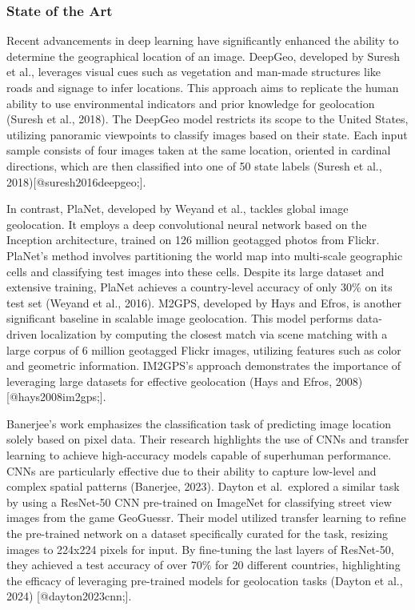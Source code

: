 \documentclass{article}
\begin{document}
\subsubsection{State of the Art}\label{state-of-the-art}

Recent advancements in deep learning have significantly enhanced the
ability to determine the geographical location of an image. DeepGeo,
developed by Suresh et al., leverages visual cues such as vegetation and
man-made structures like roads and signage to infer locations. This
approach aims to replicate the human ability to use environmental
indicators and prior knowledge for geolocation (Suresh et al., 2018).
The DeepGeo model restricts its scope to the United States, utilizing
panoramic viewpoints to classify images based on their state. Each input
sample consists of four images taken at the same location, oriented in
cardinal directions, which are then classified into one of 50 state
labels (Suresh et al., 2018){[}@suresh2016deepgeo;{]}.

In contrast, PlaNet, developed by Weyand et al., tackles global image
geolocation. It employs a deep convolutional neural network based on the
Inception architecture, trained on 126 million geotagged photos from
Flickr. PlaNet's method involves partitioning the world map into
multi-scale geographic cells and classifying test images into these
cells. Despite its large dataset and extensive training, PlaNet achieves
a country-level accuracy of only 30\% on its test set (Weyand et al.,
2016). M2GPS, developed by Hays and Efros, is another significant
baseline in scalable image geolocation. This model performs data-driven
localization by computing the closest match via scene matching with a
large corpus of 6 million geotagged Flickr images, utilizing features
such as color and geometric information. IM2GPS's approach demonstrates
the importance of leveraging large datasets for effective geolocation
(Hays and Efros, 2008){[}@hays2008im2gps;{]}\hspace{0pt}\hspace{0pt}.

Banerjee's work emphasizes the classification task of predicting image
location solely based on pixel data. Their research highlights the use
of CNNs and transfer learning to achieve high-accuracy models capable of
superhuman performance. CNNs are particularly effective due to their
ability to capture low-level and complex spatial patterns (Banerjee,
2023). Dayton et al.~explored a similar task by using a ResNet-50 CNN
pre-trained on ImageNet for classifying street view images from the game
GeoGuessr. Their model utilized transfer learning to refine the
pre-trained network on a dataset specifically curated for the task,
resizing images to 224x224 pixels for input. By fine-tuning the last
layers of ResNet-50, they achieved a test accuracy of over 70\% for 20
different countries, highlighting the efficacy of leveraging pre-trained
models for geolocation tasks (Dayton et al., 2024)
{[}@dayton2023cnn;{]}.
\end{document}
